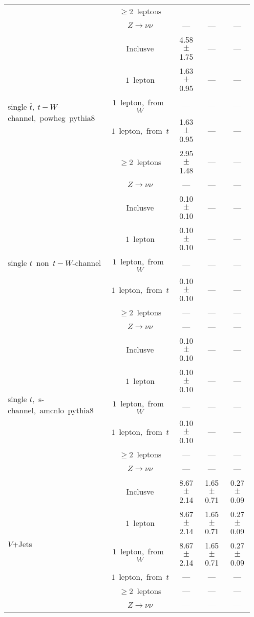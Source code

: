 \documentclass{article}
\begin{document}
\begin{longtable}{|l|c|c|c|c|}
 & $\ge2$~leptons  & ---  & ---  & --- \\* 
 & $Z\rightarrow\nu\nu$  & ---  & ---  & --- \\* 
\hline 
\multirow{6}{*}{single $\bar{t},~t-W$-channel,~powheg~pythia8} & Inclusve  & 4.58 $\pm$ 1.75  & ---  & --- \\* 
 & $1$~lepton  & 1.63 $\pm$ 0.95  & ---  & --- \\* 
 & $1$~lepton,~from~$W$  & ---  & ---  & --- \\* 
 & $1$~lepton,~from~$t$  & 1.63 $\pm$ 0.95  & ---  & --- \\* 
 & $\ge2$~leptons  & 2.95 $\pm$ 1.48  & ---  & --- \\* 
 & $Z\rightarrow\nu\nu$  & ---  & ---  & --- \\* 
\hline 
\multirow{6}{*}{single $t$~non~$t-W$-channel} & Inclusve  & 0.10 $\pm$ 0.10  & ---  & --- \\* 
 & $1$~lepton  & 0.10 $\pm$ 0.10  & ---  & --- \\* 
 & $1$~lepton,~from~$W$  & ---  & ---  & --- \\* 
 & $1$~lepton,~from~$t$  & 0.10 $\pm$ 0.10  & ---  & --- \\* 
 & $\ge2$~leptons  & ---  & ---  & --- \\* 
 & $Z\rightarrow\nu\nu$  & ---  & ---  & --- \\* 
\hline 
\multirow{6}{*}{single $t$,~s-channel,~amcnlo~pythia8} & Inclusve  & 0.10 $\pm$ 0.10  & ---  & --- \\* 
 & $1$~lepton  & 0.10 $\pm$ 0.10  & ---  & --- \\* 
 & $1$~lepton,~from~$W$  & ---  & ---  & --- \\* 
 & $1$~lepton,~from~$t$  & 0.10 $\pm$ 0.10  & ---  & --- \\* 
 & $\ge2$~leptons  & ---  & ---  & --- \\* 
 & $Z\rightarrow\nu\nu$  & ---  & ---  & --- \\* 
\hline 
\multirow{6}{*}{$V$+Jets} & Inclusve  & 8.67 $\pm$ 2.14  & 1.65 $\pm$ 0.71  & 0.27 $\pm$ 0.09 \\* 
 & $1$~lepton  & 8.67 $\pm$ 2.14  & 1.65 $\pm$ 0.71  & 0.27 $\pm$ 0.09 \\* 
 & $1$~lepton,~from~$W$  & 8.67 $\pm$ 2.14  & 1.65 $\pm$ 0.71  & 0.27 $\pm$ 0.09 \\* 
 & $1$~lepton,~from~$t$  & ---  & ---  & --- \\* 
 & $\ge2$~leptons  & ---  & ---  & --- \\* 
 & $Z\rightarrow\nu\nu$  & ---  & ---  & --- \\* 

\end{longtable}
\end{document}
